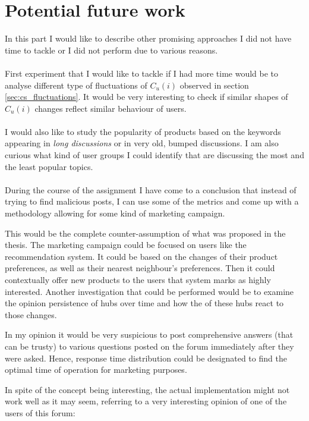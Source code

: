  \section{Potential future work}
    
    In this part I would like to describe other promising approaches I did not have time to tackle or I did not perform due to various reasons.
    \\\\
    First experiment that I would like to tackle if I had more time would be to analyse different type of fluctuations of $C_u(i)$ observed in section \ref{sec:cs_fluctuations}. It would be very interesting to check if similar shapes of $C_u(i)$ changes reflect similar behaviour of users.
    \\\\
    I would also like to study the popularity of products based on the keywords appearing in \emph{long discussions} or in very old, bumped discussions. I am also curious what kind of user groups I could identify that are discussing the most and the least popular topics. 
    \\\\
    During the course of the assignment I have come to a conclusion that instead of trying to find malicious posts, I can use some of the metrics and come up with a methodology allowing for some kind of marketing campaign.
    
    This would be the complete counter-assumption of what was proposed in the thesis. The marketing campaign could be focused on users like the recommendation system. It could be based on the changes of their product preferences, as well as their nearest neighbour's preferences. Then it could contextually offer new products to the users that system marks as highly interested. Another investigation that could be performed would be to examine the opinion persistence of hubs over time and how the  of these hubs react to those changes.

    In my opinion it would be very suspicious to post comprehensive answers (that can be trusty) to various questions posted on the forum immediately after they were asked. Hence, response time distribution could be designated to find the optimal time of operation for marketing purposes.
    
    In spite of the concept being interesting, the actual implementation might not work well as it may seem, referring to a very interesting opinion of one of the users of this forum: 